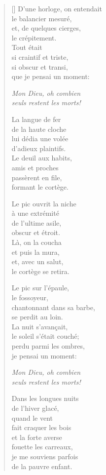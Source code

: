 \documentclass[a4paper,12pt]{book}
\begin{document}
\begin{verse}[\versewidth]
  D'une horloge, on entendait \\
  le balancier mesuré, \\
  et, de quelques cierges, \\
  le crépitement. \\
  Tout était \\
  si craintif et triste, \\
  si obscur et transi, \\
  que je pensai un moment:

  \emph{Mon Dieu, oh combien \\
  seuls restent les morts!}

  La langue de fer \\
  de la haute cloche \\
  lui dédia une volée \\
  d'adieux plaintifs. \\
  Le deuil aux habits, \\
  amis et proches \\
  passèrent en file, \\
  formant le cortège.

  Le pic ouvrit la niche \\
  à une extrémité \\
  de l'ultime asile, \\
  obscur et étroit. \\
  Là, on la coucha \\
  et puis la mura, \\
  et, avec un salut, \\
  le cortège se retira.

  Le pic sur l'épaule, \\
  le fossoyeur, \\
  chantonnant dans sa barbe, \\
  se perdit au loin. \\
  La nuit s'avançait, \\
  le soleil s'était couché; \\
  perdu parmi les ombres, \\
  je pensai un moment:

  \emph{Mon Dieu, oh combien \\
  seuls restent les morts!}

  Dans les longues nuits \\
  de l'hiver glacé, \\
  quand le vent \\
  fait craquer les bois \\
  et la forte averse \\
  fouette les carreaux, \\
  je me souviens parfois \\
  de la pauvre enfant.


\end{verse}
\end{document}
